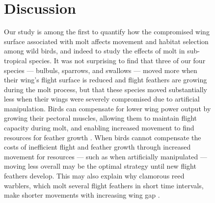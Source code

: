 \begin{figure}[!h]

\section*{Discussion}

Our study is among the first to quantify how the compromised wing surface associated with molt affects movement and habitat selection among wild birds, and indeed to study the effects of molt in sub-tropical species.
It was not surprising to find that three of our four species --- bulbuls, sparrows, and swallows --- moved more when their wing's flight surface is reduced and flight feathers are growing during the molt process, but that these species moved substantially less when their wings were severely compromised due to artificial manipulation.
Birds can compensate for lower wing power output by growing their pectoral muscles, allowing them to maintain flight capacity during molt, and enabling increased movement to find resources for feather growth \cite{chai1997,swaddle1997}.
When birds cannot compensate the costs of inefficient flight and feather growth through increased movement for resources --- such as when artificially manipulated --- moving less overall may be the optimal strategy until new flight feathers develop.
This may also explain why clamorous reed warblers, which molt several flight feathers in short time intervals, make shorter movements with increasing wing gap \cite{kiat2016}.


\end{figure}
